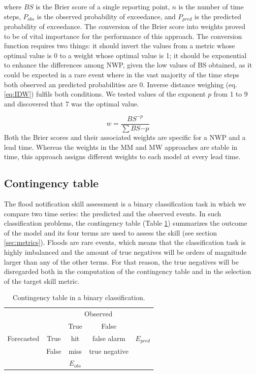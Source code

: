 \documentclass[preprint,12pt]{elsarticle}
\begin{document}
where $BS$  is the Brier score of a single reporting point, $n$  is the number of time steps, $P_{obs}$ is the observed probability of exceedance, and $P_{pred}$  is the predicted probability of exceedance. The conversion of the Brier score into weights proved to be of vital importance for the performance of this approach. The conversion function requires two things: it should invert the values from a metric whose optimal value is 0 to a weight whose optimal value is 1; it should be exponential to enhance the differences among NWP, given the low values of BS obtained, as it could be expected in a rare event where in the vast majority of the time steps both observed an predicted probabilities are 0. Inverse distance weighing (eq. \ref{eq:IDW}) fulfils both conditions. We tested values of the exponent $p$ from 1 to 9 and discovered that 7 was the optimal value.
    
\begin{equation}
    \label{eq:IDW}
    w = \frac{BS^{-p}}{\sum BS{-p}}
\end{equation}
Both the Brier scores and their associated weights are specific for a NWP and a lead time. Whereas the weights in the MM and MW approaches are stable in time, this approach assigns different weights to each model at every lead time.

\subsection{Contingency table}
\label{sec:methods_contingency}

The flood notification skill assessment is a binary classification task in which we compare two time series: the predicted and the observed events. In such classification  problems, the contingency table (Table \ref{tab:contingency_table}) summarizes the outcome of the model and its four terms are used to assess the skill (see section \ref{sec:metrics}). Floods are rare events, which means that the classification task is highly imbalanced and the amount of true negatives will be orders of magnitude larger than any of the other terms. For that reason, the true negatives will be disregarded both in the computation of the contingency table and in the selection of the target skill metric.

\begin{table}
    \centering
    \caption{Contingency table in a binary classification.}
    \footnotesize
    \begin{tabular}{ccccc}
        \toprule
        & & \multicolumn{2}{c}{Observed} & \\
        \cmidrule{3-4}
        & & True & False & \\
        \midrule
        Forecasted & True & hit & false alarm & $E_{pred}$ \\
        & False & miss & true negative & \\
        &  & $E_{obs}$ & & \\
        \bottomrule
    \end{tabular}
    \label{tab:contingency_table}
\end{table}
\end{document}
